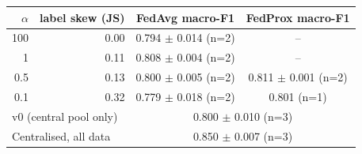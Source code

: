 \begin{tabular}{rrcc}
\toprule
$\alpha$ & label skew (JS) & FedAvg macro-F1 & FedProx macro-F1 \\
\midrule
100 & 0.00 & 0.794 $\pm$ 0.014 (n=2) & -- \\
1 & 0.11 & 0.808 $\pm$ 0.004 (n=2) & -- \\
0.5 & 0.13 & 0.800 $\pm$ 0.005 (n=2) & 0.811 $\pm$ 0.001 (n=2) \\
0.1 & 0.32 & 0.779 $\pm$ 0.018 (n=2) & 0.801 (n=1) \\
\midrule
\multicolumn{2}{l}{v0 (central pool only)} & \multicolumn{2}{c}{0.800 $\pm$ 0.010 (n=3)} \\
\multicolumn{2}{l}{Centralised, all data} & \multicolumn{2}{c}{0.850 $\pm$ 0.007 (n=3)} \\
\bottomrule
\end{tabular}